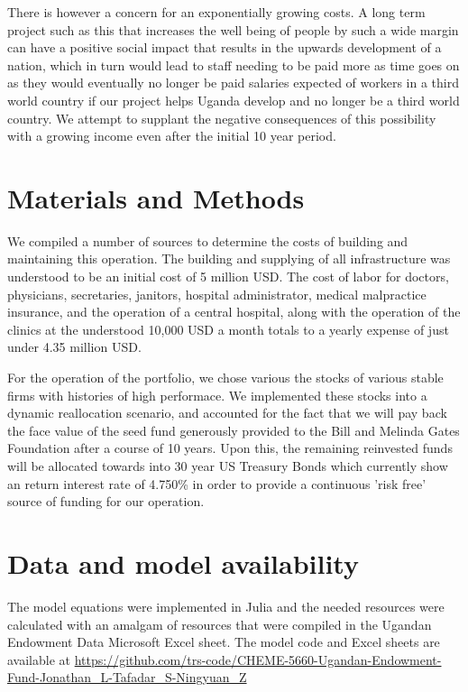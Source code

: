 \documentclass[10pt,twocolumn,twoside,final]{IEEEtran}
\begin{document}
There is however a concern for an exponentially growing costs. A long term project such as this that increases the well being of people by such a wide margin can have a positive social impact that results in the upwards development of a nation, which in turn would lead to staff needing to be paid more as time goes on as they would eventually no longer be paid salaries expected of workers in a third world country if our project helps Uganda develop and no longer be a third world country. We attempt to supplant the negative consequences of this possibility with a growing income even after the initial 10 year period.

\section{Materials and Methods}
We compiled a number of sources to determine the costs of building and maintaining this operation. The building and supplying of all infrastructure was understood to be an initial cost of 5 million USD. The cost of labor for doctors, physicians, secretaries, janitors, hospital administrator, medical malpractice insurance, and the operation of a central hospital, along with the operation of the clinics at the understood 10,000 USD a month totals to a yearly expense of just under 4.35 million USD.

For the operation of the portfolio, we chose various the stocks of various stable firms with histories of high performace. We implemented these stocks into a dynamic reallocation scenario, and accounted for the fact that we will pay back the face value of the seed fund generously provided to the Bill and Melinda Gates Foundation after a course of 10 years. Upon this, the remaining reinvested funds will be allocated towards into 30 year US Treasury Bonds which currently show an return interest rate of 4.750\% in order to provide a continuous 'risk free' source of funding for our operation. 

\section{Data and model availability}
The model equations were implemented in Julia and the needed resources were calculated with an amalgam of resources that were compiled in the Ugandan Endowment Data Microsoft Excel sheet.
The model code and Excel sheets are available at \url{https://github.com/trs-code/CHEME-5660-Ugandan-Endowment-Fund-Jonathan_L-Tafadar_S-Ningyuan_Z}



\end{document}
